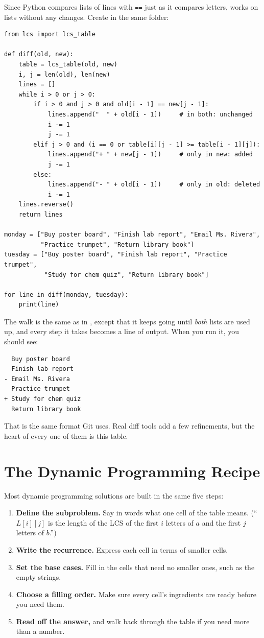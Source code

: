 Since Python compares lists of lines with \verb|==| just as it compares letters, 
works on lists without any changes. Create  in the same folder:

\begin{verbatim}
from lcs import lcs_table

def diff(old, new):
    table = lcs_table(old, new)
    i, j = len(old), len(new)
    lines = []
    while i > 0 or j > 0:
        if i > 0 and j > 0 and old[i - 1] == new[j - 1]:
            lines.append("  " + old[i - 1])     # in both: unchanged
            i -= 1
            j -= 1
        elif j > 0 and (i == 0 or table[i][j - 1] >= table[i - 1][j]):
            lines.append("+ " + new[j - 1])     # only in new: added
            j -= 1
        else:
            lines.append("- " + old[i - 1])     # only in old: deleted
            i -= 1
    lines.reverse()
    return lines

monday = ["Buy poster board", "Finish lab report", "Email Ms. Rivera",
          "Practice trumpet", "Return library book"]
tuesday = ["Buy poster board", "Finish lab report", "Practice trumpet",
           "Study for chem quiz", "Return library book"]

for line in diff(monday, tuesday):
    print(line)
\end{verbatim}

The walk is the same as in , except that it keeps going until \emph{both} lists are used up,
and every step it takes becomes a line of output. When you run it, you should see:
\begin{verbatim}
  Buy poster board
  Finish lab report
- Email Ms. Rivera
  Practice trumpet
+ Study for chem quiz
  Return library book
\end{verbatim}

That is the same format Git uses. Real diff tools add a few refinements, but the heart of every one of them is
this table.

\section{The Dynamic Programming Recipe}
Most dynamic programming solutions are built in the same five steps:
\begin{enumerate}
\item \textbf{Define the subproblem.} Say in words what one cell of the table means. (``$L[i][j]$ is the length
of the LCS of the first $i$ letters of $a$ and the first $j$ letters of $b$.'')
\item \textbf{Write the recurrence.} Express each cell in terms of smaller cells.
\item \textbf{Set the base cases.} Fill in the cells that need no smaller ones, such as the empty strings.
\item \textbf{Choose a filling order.} Make sure every cell's ingredients are ready before you need them.
\item \textbf{Read off the answer,} and walk back through the table if you need more than a number.
\end{enumerate}

